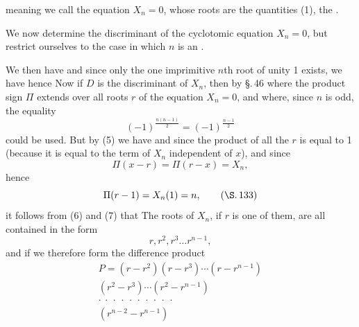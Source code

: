 
meaning we call the equation $X_n = 0$, whose roots are the quantities (1), the .

We now determine the discriminant of the cyclotomic equation $X_n = 0$, but restrict ourselves to the case in which $n$ is an .

We then have
and since only the one imprimitive $n$th root of unity 1 exists, we have
hence
Now if $D$ is the discriminant of $X_n$, then by \S.\,46
where the product sign $\Pi$ extends over all roots $r$ of the equation $X_n = 0$, and where, since $n$ is odd, the equality
\[
(-1)^{\frac{n(n-1)}{2}} = (-1)^{\frac{n-1}{2}}
\]
could be used. But by (5) we have
and since the product of all the $r$ is equal to 1 (because it is equal to the term of $X_n$ independent of $x$), and since
\[
\Pi(x-r) = \Pi(r-x) = X_n,
\]
hence
\[
\Pi(r-1) = X_n(1) = n, \qquad (\text{\S.\,133})
\]
it follows from (6) and (7) that
The roots of $X_n$, if $r$ is one of them, are all contained in the form
\[
r, r^2, r^3 \ldots r^{n-1},
\]
and if we therefore form the difference product
\begin{equation}
\tag*{9)}
\begin{gathered}
P = (r - r^2)(r - r^3) \cdots (r - r^{n-1}) \\
(r^2 - r^3) \cdots (r^2 - r^{n-1}) \\
\cdot\ \cdot\ \cdot\ \cdot\ \cdot\ \cdot\ \cdot\ \cdot\ \cdot\ \cdot \\
(r^{n-2} - r^{n-1})
\end{gathered}
\end{equation} %
